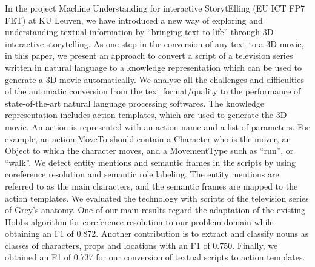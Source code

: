 \documentclass[10pt, a4paper, twopage, headinclude, footinclude, BCOR5mm]{book}
\begin{document}
\begin{table}[t!]
\end{table} 
\begin{table}[t!]
\end{table} 
\noindent
In the project Machine Understanding for interactive StorytElling (EU ICT FP7 FET) at KU Leuven, we have introduced a new way of exploring and understanding textual information by “bringing text to life” through 3D interactive storytelling. As one step in the conversion of any text to a 3D movie, in this paper, we present an approach to convert a script of a television series written in natural language to a knowledge representation which can be used to generate a 3D movie automatically.  We analyse all the challenges and difficulties of the automatic conversion from the text format/quality to the performance of state-of-the-art natural language processing softwares. The knowledge representation includes action templates, which are used to generate the 3D movie. An action is represented with an action name and a list of parameters. For example, an action MoveTo should contain a Character who is the mover, an Object to which the character moves, and a MovementType such as “run”, or “walk”. We detect entity mentions and semantic frames in the scripts by using coreference resolution and semantic role labeling. The entity mentions are referred to as the main characters, and the semantic frames are mapped to the action templates. We evaluated the technology with scripts of the television series of Grey's anatomy. One of our main results regard the adaptation of the existing Hobbs algorithm for coreference resolution to our problem domain while obtaining an F1 of 0.872. Another contribution is to extract and classify nouns as classes of characters, props and locations with an F1 of 0.750. Finally, we obtained an F1 of 0.737 for our conversion of textual scripts to action templates.   
\end{document}
